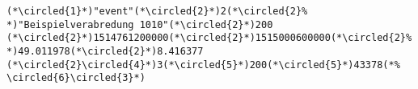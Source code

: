 \documentclass[aspectratio=0510]{beamer}
\begin{document}
    \newcommand*\circled[1]{\tikz[baseline=(char.base)]{
    \node[shape=circle,draw,inner sep=1pt] (char) {\scriptsize #1};}}
    \begin{lstlisting}[language=norm,firstnumber=1]
(*\circled{1}*)"event"(*\circled{2}*)2(*\circled{2}%
*)"Beispielverabredung 1010"(*\circled{2}*)200
(*\circled{2}*)1514761200000(*\circled{2}*)1515000600000(*\circled{2}%
*)49.011978(*\circled{2}*)8.416377
(*\circled{2}\circled{4}*)3(*\circled{5}*)200(*\circled{5}*)43378(*%
\circled{6}\circled{3}*)
    \end{lstlisting}
\end{document}
